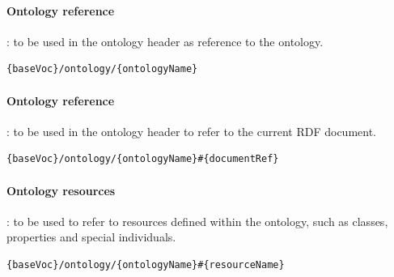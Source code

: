 	\paragraph{Ontology reference}: to be used in the ontology header as reference to the ontology.
\begin{lstlisting}[language=XML,frame=none, basicstyle=\footnotesize\ttfamily,breaklines=true,]
{baseVoc}/ontology/{ontologyName}
\end{lstlisting}
		
	\paragraph{Ontology reference}: to be used in the ontology header to refer to the current RDF document.
\begin{lstlisting}[language=XML,frame=none, basicstyle=\footnotesize\ttfamily,breaklines=true,]
{baseVoc}/ontology/{ontologyName}#{documentRef}
\end{lstlisting}

	\paragraph{Ontology resources}: to be used to refer to resources defined within the ontology, such as classes, properties and special individuals.	
\begin{lstlisting}[language=XML,frame=none, basicstyle=\footnotesize\ttfamily,breaklines=true,]
{baseVoc}/ontology/{ontologyName}#{resourceName}
\end{lstlisting}


	
	
	